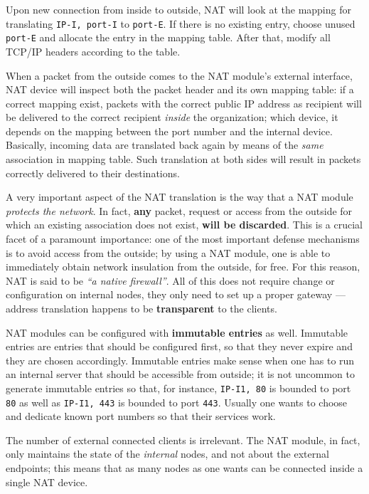\documentclass[10pt]{\classname}
\begin{document}
Upon new connection from inside to outside, NAT will look at the mapping for
translating \texttt{IP-I, port-I} to \texttt{port-E}. If there is no existing
entry, choose unused \texttt{port-E} and allocate the entry in the mapping
table. After that, modify all TCP/IP headers according to the table.

When a packet from the outside comes to the NAT module's external interface,
NAT device will inspect both the packet header and its own mapping table: if a
correct mapping exist, packets with the correct public IP address as recipient
will be delivered to the correct recipient \emph{inside} the organization;
which device, it depends on the mapping between the port number and the
internal device. Basically, incoming data are translated back again by means of
the \emph{same} association in mapping table. Such translation at both sides
will result in packets correctly delivered to their destinations.

A very important aspect of the NAT translation is the way that a NAT module
\emph{protects the network}. In fact, \textbf{any} packet, request or access
from the outside for which an existing association does not exist, \textbf{will
be discarded}. This is a crucial facet of a paramount importance: one of the
most important defense mechanisms is to avoid access from the outside; by using
a NAT module, one is able to immediately obtain network insulation from the
outside, for free. For this reason, NAT is said to be \emph{``a native
firewall''}. All of this does not require change or configuration on internal
nodes, they only need to set up a proper gateway --- address translation happens
to be \textbf{transparent} to the clients.

NAT modules can be configured with \textbf{immutable entries} as well.
Immutable entries are entries that should be configured first, so that they
never expire and they are chosen accordingly. Immutable entries make sense when
one has to run an internal server that should be accessible from outside; it is
not uncommon to generate immutable entries so that, for instance,
\texttt{IP-I1, 80} is bounded to port \texttt{80} as well as \texttt{IP-I1,
443} is bounded to port \texttt{443}. Usually one wants to choose and dedicate
known port numbers so that their services work.

The number of external connected clients is irrelevant. The NAT module, in
fact, only maintains the state of the \emph{internal} nodes, and not about the
external endpoints; this means that as many nodes as one wants can be connected
inside a single NAT device.
\end{document}
